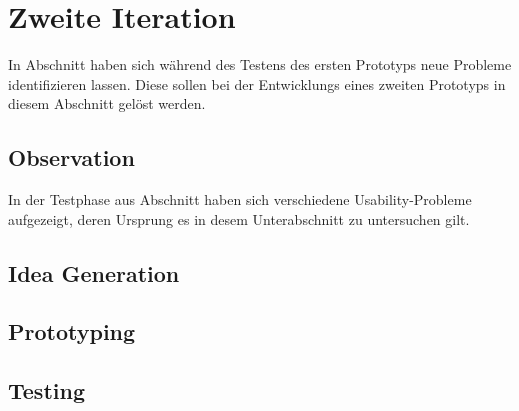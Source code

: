 \section{Zweite Iteration}

In Abschnitt  haben sich während des Testens des ersten Prototyps neue Probleme identifizieren lassen.
Diese sollen bei der Entwicklungs eines zweiten Prototyps in diesem Abschnitt gelöst werden. \\

\subsection{Observation}
In der Testphase aus Abschnitt  haben sich verschiedene Usability-Probleme aufgezeigt, deren Ursprung es in desem Unterabschnitt zu untersuchen gilt. \\

\subsection{Idea Generation}
\subsection{Prototyping}
\subsection{Testing}
